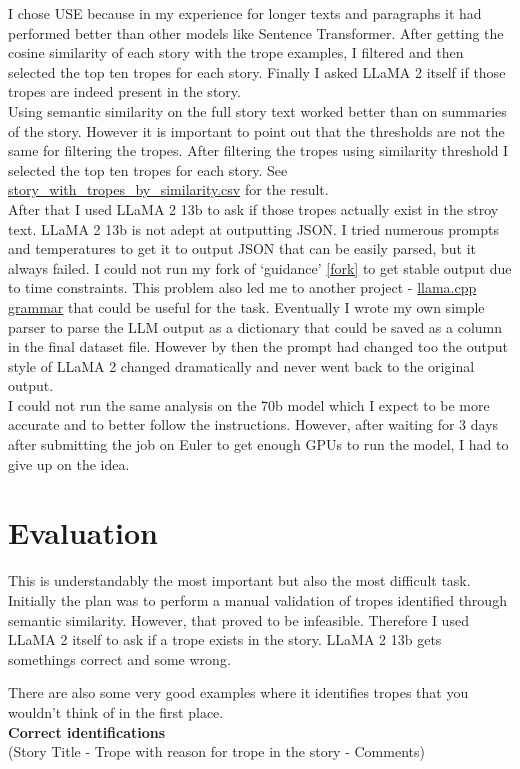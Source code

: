 \documentclass[11pt]{article}
\begin{document}
I chose USE because in my experience for longer texts and paragraphs it had performed better than other models like Sentence Transformer. After getting the cosine similarity of each story with the trope examples, I filtered and then selected the top ten tropes for each story. Finally I asked LLaMA 2 itself if those tropes are indeed present in the story.
\\
Using semantic similarity on the full story text worked better than on summaries of the story. However it is important to point out that the thresholds are not the same for filtering the tropes. 
After filtering the tropes using similarity threshold I selected the top ten tropes for each story. See \href{https://github.com/armsp/trama/blob/main/dataset/story_with_tropes_by_similarity.csv}{story\_with\_tropes\_by\_similarity.csv} for the result. 
\\
After that I used LLaMA 2 13b to ask if those tropes actually exist in the stroy text. LLaMA 2 13b is not adept at outputting JSON. I tried numerous prompts and temperatures to get it to output JSON that can be easily parsed, but it always failed. I could not run my fork of `guidance' \ref{fork} to get stable output due to time constraints. This problem also led me to another project - \href{https://github.com/ggerganov/llama.cpp/tree/master/grammars}{llama.cpp grammar} that could be useful for the task. Eventually I wrote my own simple parser to parse the LLM output as a dictionary that could be saved as a column in the final dataset file. However by then the prompt had changed too the output style of LLaMA 2 changed dramatically and never went back to the original output.\\
I could not run the same analysis on the 70b model which I expect to be more accurate and to better follow the instructions. However, after waiting for 3 days after submitting the job on Euler to get enough GPUs to run the model, I had to give up on the idea. 

\section{Evaluation}
This is understandably the most important but also the most difficult task. Initially the plan was to perform a manual validation of tropes identified through semantic similarity. However, that proved to be infeasible. Therefore I used LLaMA 2 itself to ask if a trope exists in the story. LLaMA 2 13b gets somethings correct and some wrong.

There are also some very good examples where it identifies tropes that you wouldn't think of in the first place.\\
\textbf{Correct identifications}\\
(Story Title - Trope with reason for trope in the story - Comments)
\end{document}
